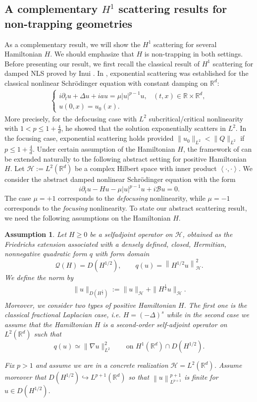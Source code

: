 \documentclass[10pt%
]{amsart}
\numberwithin{equation}{section}
\newcommand{\norm}[1]{\left\|#1\right\|}
\newcommand{\R}{\mathbb{R}}
\newcommand{\ip}[2]{\left\langle #1,#2\right\rangle}
\newtheorem{assumption}{Assumption}[section]
\theoremstyle{definition}
\begin{document}
\subsection{A complementary $H^1$ scattering results for non-trapping geometries}
As a complementary result, we will show the $H^1$ scattering for several Hamiltonian $H$. We should emphasize that $H$ is non-trapping in both settings. Before presenting our result, we first recall the classical result of $H^1$ scattering for damped NLS proved by Inui \cite{Inui}. In \cite{Inui}, exponential scattering was established for the classical nonlinear Schr\"odinger equation with constant damping on $\mathbb R^d$:
\begin{align*}
  \begin{cases}
  i\partial_tu+\Delta u+iau=\mu|u|^{p-1}u,&(t,x)\in\R\times\R^d,\\
  u(0,x)=u_0(x).
  \end{cases}
\end{align*}
 More precisely,   for the  defocusing case with $L^2$ subcritical/critical nonlinearity   with  $1<p\leq1+\frac{4}{d}$, he showed that the solution exponentially scatters in $L^2$. In the  focusing case, exponential scattering holds provided $\|u_0\|_{L^2}<\|Q\|_{L^2}$ if $p\leq 1+\frac{4}{d}$. Under certain assumption of the Hamiltonian $H$, the framework of \cite{Inui} can be extended naturally  to the following abstract setting for positive Hamiltonian $H$. Let $\mathcal H:=L^2(\mathbb R^d)$ be a complex Hilbert space with inner product $\ip{\cdot}{\cdot}$. We consider the abstract damped nonlinear Schr\"odinger equation with the form
\begin{equation}\label{eq:damped}
i\partial_t u - Hu - \mu |u|^{p-1}u + i\mathcal B u = 0.
\end{equation}
The case $\mu=+1$ corresponds to the \emph{defocusing} nonlinearity, while $\mu=-1$ corresponds to the \emph{focusing} nonlinearity. 	
	To state our abstract scattering result, we need the following assumptions on the Hamiltonian $H$.  
	\begin{assumption}\label{ass:H}Let $H\ge 0$ be a selfadjoint operator on $\mathcal H$, obtained as the Friedrichs extension
		associated with a densely defined, closed, Hermitian, nonnegative quadratic form $q$ with form domain
		\[
		\mathcal Q(H)=D(H^{1/2}),\qquad q(u)=\norm{H^{1/2}u}_{\mathcal H}^2.
		\]
		We define the norm by
\begin{align*}
  \|u\|_{D(H^\frac12)}:=\|u\|_{\mathcal{H}}+\|H^\frac{1}{2}u\|_{\mathcal{H}}.
\end{align*}
		Moreover, we consider two types of positive Hamiltonian $H$.
		The first one is the classical fractional Laplacian case, i.e. $H=(-\Delta)^s$ while in the second case we assume that the Hamiltonian $H$ is a second-order self-adjoint operator on
		$L^2(\mathbb R^d)$ such that
		\[
		q(u)\simeq \|\nabla u\|_{L^2}^2
		\qquad \text{on } H^1(\mathbb R^d)\cap D(H^{1/2}).
		\]
		
		
		Fix $p>1$ and assume we are in a concrete realization $\mathcal H=L^2(\R^d)$.
		Assume moreover that $D(H^{1/2})\hookrightarrow L^{p+1}(\R^d)$ so that
		$\norm{u}_{L^{p+1}}^{p+1}$ is finite for $u\in D(H^{1/2})$. 
	\end{assumption}
	
\end{document}
